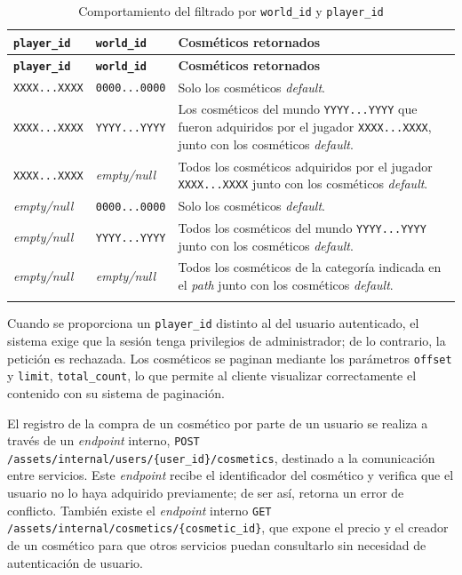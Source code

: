 \renewcommand{\arraystretch}{1.4}
\begin{longtable}{|l|l|p{7cm}|}
\hline
\textbf{\texttt{player\_id}} & \textbf{\texttt{world\_id}} & \textbf{Cosméticos retornados} \\
\hline
\endfirsthead
\hline
\textbf{\texttt{player\_id}} & \textbf{\texttt{world\_id}} & \textbf{Cosméticos retornados} \\
\hline
\endhead
\endfoot

\texttt{XXXX...XXXX} & \texttt{0000...0000} & Solo los cosméticos \textit{default}. \\
\hline
\texttt{XXXX...XXXX} & \texttt{YYYY...YYYY} & Los cosméticos del mundo \texttt{YYYY...YYYY} que fueron adquiridos por el jugador \texttt{XXXX...XXXX}, junto con los cosméticos \textit{default}. \\
\hline
\texttt{XXXX...XXXX} & \textit{empty/null}  & Todos los cosméticos adquiridos por el jugador \texttt{XXXX...XXXX} junto con los cosméticos \textit{default}. \\
\hline
\textit{empty/null}  & \texttt{0000...0000} & Solo los cosméticos \textit{default}. \\
\hline
\textit{empty/null}  & \texttt{YYYY...YYYY} & Todos los cosméticos del mundo \texttt{YYYY...YYYY} junto con los cosméticos \textit{default}. \\
\hline
\textit{empty/null}  & \textit{empty/null}  & Todos los cosméticos de la categoría indicada en el \textit{path} junto con los cosméticos \textit{default}. \\
\hline
\caption{Comportamiento del filtrado por \texttt{world\_id} y \texttt{player\_id}}
\label{tab:cosmetics-filter}
\end{longtable}

Cuando se proporciona un \texttt{player\_id} distinto al del usuario autenticado, el sistema exige que la sesión
tenga privilegios de administrador; de lo contrario, la petición es rechazada. Los cosméticos se paginan mediante
los parámetros \texttt{offset} y \texttt{limit}, \texttt{total\_count}, lo que permite al cliente visualizar correctamente 
el contenido con su sistema de paginación.

\vspace{0.25cm}

El registro de la compra de un cosmético por parte de un usuario se realiza a través de un \textit{endpoint} interno,
\texttt{POST /assets/internal/users/\{user\_id\}/cosmetics}, destinado a la comunicación entre servicios. Este
\textit{endpoint} recibe el identificador del cosmético y verifica que el usuario no lo haya adquirido previamente;
de ser así, retorna un error de conflicto. También existe el \textit{endpoint} interno
\texttt{GET /assets/internal/cosmetics/\{cosmetic\_id\}}, que expone el precio y el creador de un cosmético para
que otros servicios puedan consultarlo sin necesidad de autenticación de usuario.
\vspace{0.25cm}
